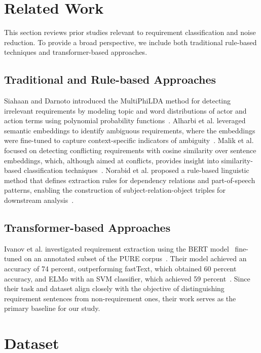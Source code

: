 \documentclass[sigconf,review]{acmart}
\begin{document}
\section{Related Work}
\label{sec:literature_review}

This section reviews prior studies relevant to requirement classification and noise reduction. To provide a broad perspective, we include both traditional rule-based techniques and transformer-based approaches.

\subsection{Traditional and Rule-based Approaches}

Siahaan and Darnoto introduced the MultiPhiLDA method for detecting irrelevant requirements by modeling topic and word distributions of actor and action terms using polynomial probability functions~\cite{siahaan2022novel}. Alharbi et al. leveraged semantic embeddings to identify ambiguous requirements, where the embeddings were fine-tuned to capture context-specific indicators of ambiguity~\cite{alharbi2022ambiguity}. Malik et al. focused on detecting conflicting requirements with cosine similarity over sentence embeddings, which, although aimed at conflicts, provides insight into similarity-based classification techniques~\cite{malik2022identifying}. Norabid et al. proposed a rule-based linguistic method that defines extraction rules for dependency relations and part-of-speech patterns, enabling the construction of subject-relation-object triples for downstream analysis~\cite{norabid2022rule}.

\subsection{Transformer-based Approaches}

Ivanov et al. investigated requirement extraction using the BERT model~\cite{devlin2018bert} fine-tuned on an annotated subset of the PURE corpus~\cite{ferrari2017pure}. Their model achieved an accuracy of 74 percent, outperforming fastText, which obtained 60 percent accuracy, and ELMo with an SVM classifier, which achieved 59 percent~\cite{ivanov2021regexppure}. Since their task and dataset align closely with the objective of distinguishing requirement sentences from non-requirement ones, their work serves as the primary baseline for our study.



\section{Dataset}
\label{Dataset}
\end{document}
